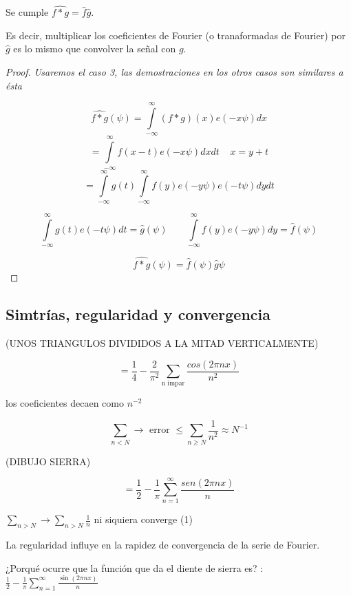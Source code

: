 \begin{prop}
	Se cumple $\hat{f*g} = \hat{f} \hat{g}$.

	Es decir, multiplicar los coeficientes de Fourier (o tranaformadas de Fourier) por $\hat{g}$ es lo mismo que convolver la señal con $g$.

\end{prop}

\begin{proof}
	\textit{Usaremos el caso 3, las demostraciones en los otros casos son similares a ésta}

$$ \hat{f*g}(\psi) = \int\limits^{\infty}_{-\infty} (f*g)(x) e(-x\psi)dx $$
$$ = \int\limits^{\infty}_{-\infty} f(x - t) e (-x \psi) dx dt \;\;\;\; x = y + t$$
$$ = \int\limits^{\infty}_{-\infty} g(t) \int\limits^{\infty}_{-\infty} f(y) e (-y \psi) e(-t\psi)dy dt$$

$$ \int\limits^{\infty}_{-\infty} g(t) e(-t\psi) dt = \hat{g}(\psi) \;\;\;\;\;\;\; \int\limits^{\infty}_{-\infty} f(y) e (-y \psi) dy = \hat{f}(\psi) $$

$$\hat{f*g} (\psi) = \hat{f}(\psi) \hat{g}\psi $$

\end{proof}



\subsection{Simtrías, regularidad y convergencia}


(UNOS TRIANGULOS DIVIDIDOS A LA MITAD VERTICALMENTE)

$$ = \frac{1}{4} - \frac{2}{\pi^2} \sum_{\text{n impar}} \frac{cos(2 \pi n x)}{n^2}$$

los coeficientes decaen como $n^{-2}$

$$ \sum_{n < N} \rightarrow \text{ error } \leq \sum_{n \geq N} \frac{1}{n^2}  ≈ N^{-1} $$



(DIBUJO SIERRA)

$$ = \frac{1}{2} - \frac{1}{\pi} \sum^{\infty}_{n = 1} \frac{sen(2 \pi n x)}{n}$$

$ \sum_{n > N} \rightarrow \sum_{n > N} \frac{1}{n}$ ni siquiera converge (1)

La regularidad influye en la rapidez de convergencia de la serie de Fourier.




¿Porqué ocurre que la función que da el diente de sierra es? : $\frac{1}{2} - \frac{1}{\pi} \sum_{n=1}^{\infty} \frac{\sin(2\pi nx)}{n}$

